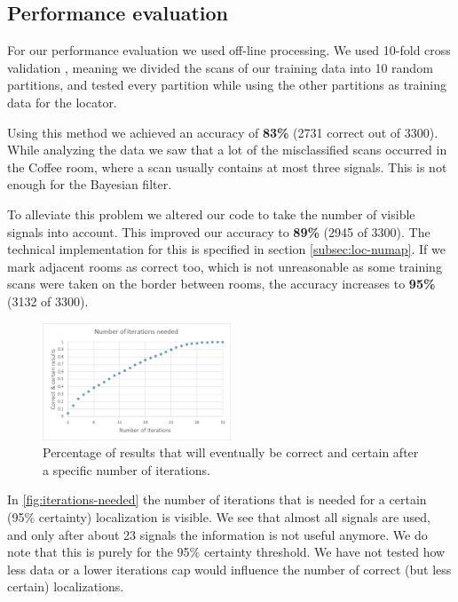 \documentclass[a4paper,10pt,twoside]{IEEEtran}
\begin{document}
\subsection{Performance evaluation}
\label{sec:loc-evaluation}

For our performance evaluation we used off-line processing.
We used 10-fold cross validation \cite{mit1}, meaning we divided the scans of our training data into 10 random partitions, and tested every partition while using the other partitions as training data for the locator.

Using this method we achieved an accuracy of \textbf{83\%} (2731 correct out of 3300).
While analyzing the data we saw that a lot of the misclassified scans occurred in the Coffee room,
where a scan usually contains at most three signals. This is not enough for the Bayesian filter.

To alleviate this problem we altered our code to take the number of visible signals into account.
This improved our accuracy to \textbf{89\%} (2945 of 3300).
The technical implementation for this is specified in section \ref{subsec:loc-numap}.
If we mark adjacent rooms as correct too, which is not unreasonable as some training scans were taken on the border between rooms, the accuracy increases to \textbf{95\%} (3132 of 3300).

\begin{figure}
  \centering
    \includegraphics[width=0.5\textwidth]{iterations_needed}
    \caption{Percentage of results that will eventually be correct and certain after a specific number of iterations.}
    \label{fig:iterations-needed}
\end{figure}

In \autoref{fig:iterations-needed} the number of iterations that is needed for a certain (95\% certainty) localization is visible.
We see that almost all signals are used, and only after about 23 signals the information is not useful anymore.
We do note that this is purely for the 95\% certainty threshold.
We have not tested how less data or a lower iterations cap would influence the number of correct (but less certain) localizations.
\end{document}
